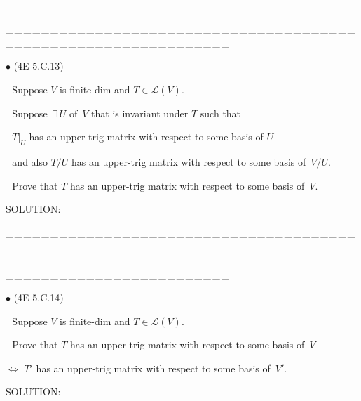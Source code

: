 \documentclass[a4paper, 11pt, UTF8]{article}
\def\Lm{\mathcal{L}}
\begin{document}
\begin{large}
\par
{\tiny \_\,\_\,\_\,\_\,\_\,\_\,\_\,\_\,\_\,\_\,\_\,\_\,\_\,\_\,\_\,\_\,\_\,\_\,\_\,\_\,\_\,\_\,\_\,\_\,\_\,\_\,\_\,\_\,\_\,\_\,\_\,\_\,\_\,\_\,\_\,\_\,\_\,\_\,\_\,\_\,\_\,\_\,\_\,\_\,\_\,\_\,\_\,\_\,\_\,\_\,\_\,\_\,\_\,\_\,\_\,\_\,\_\,\_\,\_\,\_\,\_\,\_\,\_\,\_\,\_\,\_\,\_\,\_\,\_\,\_\,\_\_\,\_\,\_\,\_\,\_\,\_\,\_\,\_\,\_\,\_\,\_\,\_\,\_\,\_\,\_\,\_\,\_\,\_\,\_\,\_\,\_\,\_\,\_\,\_\,\_\,\_\,\_\,\_\,\_\,\_\,\_\,\_\,\_\,\_\,\_\,\_\,\_\,\_\,\_\,\_\,\_\,\_\,\_\,\_\,\_\,\_\,\_\,\_\,\_\,\_\,\_\,\_\,\_\,\_\,\_\,\_\,\_\,\_\,\_\,\_\,\_\,\_\,\_\,\_\,\_\,\_\,\_\,\_\,\_\,\_\,\_}\par

{\small $\bullet$} ({\normalsize 4E 5.C.13})\par\,\, {\timessl\Large 
Suppose $V$ is finite-dim and $T\in \Lm(V)$.}\par\,\,
{\timessl\Large Suppose $\,\exists\,U$ of \,$V$ that is invariant under $T$ such that}\par\,\,
{\timessl\Large $T|_U$ has an upper-trig matrix with respect to some basis of $U$}\par\,\,
{\timessl\Large and also $T/U$ has an upper-trig matrix with respect to some basis of \,$V/U$.}\par\,\,
{\timessl\Large Prove that $T$ has an upper-trig matrix with respect to some basis of \,$V$.
}\par
{\timesbf S\footnotesize{OLUTION:}}\par\quad

\par
{\tiny \_\,\_\,\_\,\_\,\_\,\_\,\_\,\_\,\_\,\_\,\_\,\_\,\_\,\_\,\_\,\_\,\_\,\_\,\_\,\_\,\_\,\_\,\_\,\_\,\_\,\_\,\_\,\_\,\_\,\_\,\_\,\_\,\_\,\_\,\_\,\_\,\_\,\_\,\_\,\_\,\_\,\_\,\_\,\_\,\_\,\_\,\_\,\_\,\_\,\_\,\_\,\_\,\_\,\_\,\_\,\_\,\_\,\_\,\_\,\_\,\_\,\_\,\_\,\_\,\_\,\_\,\_\,\_\,\_\,\_\,\_\_\,\_\,\_\,\_\,\_\,\_\,\_\,\_\,\_\,\_\,\_\,\_\,\_\,\_\,\_\,\_\,\_\,\_\,\_\,\_\,\_\,\_\,\_\,\_\,\_\,\_\,\_\,\_\,\_\,\_\,\_\,\_\,\_\,\_\,\_\,\_\,\_\,\_\,\_\,\_\,\_\,\_\,\_\,\_\,\_\,\_\,\_\,\_\,\_\,\_\,\_\,\_\,\_\,\_\,\_\,\_\,\_\,\_\,\_\,\_\,\_\,\_\,\_\,\_\,\_\,\_\,\_\,\_\,\_\,\_\,\_}\par

{\small $\bullet$} ({\normalsize 4E 5.C.14})\par\,\, {\timessl\Large 
Suppose $V$ is finite-dim and $T\in \Lm(V)$.}\par\,\,
{\timessl\Large Prove that $T$ has an upper-trig matrix with respect to some basis of \,$V$}\par\qquad\quad
{\timessl\Large $\Longleftrightarrow$ $T'$ has an upper-trig matrix with respect to some basis of \,$V'$.
}\par
{\timesbf S\footnotesize{OLUTION:}}\par\quad


\end{large}
\end{document}
